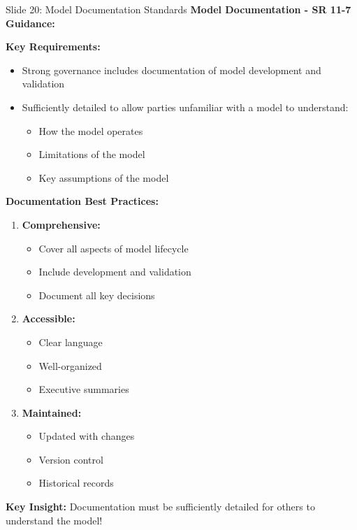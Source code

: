 \documentclass[8pt]{beamer}
\begin{document}
	\begin{frame}{Slide 20: Model Documentation Standards}
		\fontsize{6.5}{7.5}\selectfont
		\textbf{Model Documentation - SR 11-7 Guidance:}
		
		\vspace{0.1cm}
		\textbf{Key Requirements:}
		\begin{itemize}
			\item Strong governance includes documentation of model development and validation
			\item Sufficiently detailed to allow parties unfamiliar with a model to understand:
			\begin{itemize}
				\item How the model operates
				\item Limitations of the model
				\item Key assumptions of the model
			\end{itemize}
		\end{itemize}
		
		\vspace{0.1cm}
		\textbf{Documentation Best Practices:}
		\begin{enumerate}
			\item \textbf{Comprehensive:}
			\begin{itemize}
				\item Cover all aspects of model lifecycle
				\item Include development and validation
				\item Document all key decisions
			\end{itemize}
			\item \textbf{Accessible:}
			\begin{itemize}
				\item Clear language
				\item Well-organized
				\item Executive summaries
			\end{itemize}
			\item \textbf{Maintained:}
			\begin{itemize}
				\item Updated with changes
				\item Version control
				\item Historical records
			\end{itemize}
		\end{enumerate}
		
		\textcolor{myblue}{\textbf{Key Insight:}} Documentation must be \textcolor{myblue}{sufficiently detailed for others to understand the model}!
	\end{frame}
	
\end{document}
